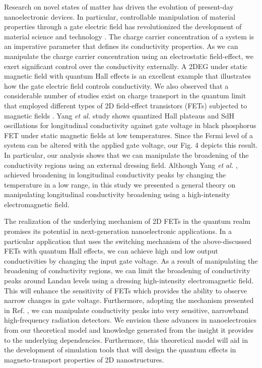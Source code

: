\documentclass{article}
\begin{document}
\begin{itemize}
{  Research on novel states of matter has driven the evolution of present-day nanoelectronic devices. In particular, controllable manipulation of material properties through a gate electric field has revolutionized the development of material science and technology \cite{ahn03,deng18}.
  The charge carrier concentration of a system is an imperative parameter that defines its conductivity properties.
  As we can manipulate the charge carrier concentration using an electrostatic field-effect, we exert significant control over the conductivity externally.
  A 2DEG under static magnetic field with quantum Hall effects is an excellent example that illustrates how the gate electric field controls conductivity.
  We also observed that a considerable number of studies exist on charge transport in the quantum limit that employed different types of 2D field-effect transistors (FETs) subjected to magnetic fields \cite{wakabayashi78,yang18,long20,li14}. Yang \textit{et al.} \cite{yang18} study shows quantized Hall plateaus and SdH oscillations for longitudinal conductivity against gate voltage in black phosphorus FET under static magnetic fields at low temperatures. Since the Fermi level of a system can be altered with the applied gate voltage, our Fig. 4 depicts this result.
  In particular, our analysis shows that we can manipulate the broadening of the conductivity regions using an external dressing field. Although Yang \textit{et al.} \cite{yang18}, achieved broadening in longitudinal conductivity peaks by changing the temperature in a low range, in this study we presented a general theory on manipulating longitudinal conductivity broadening using a high-intensity electromagnetic field.

  The realization of the underlying mechanism of 2D FETs in the quantum realm promises its potential in next-generation nanoelectronic applications. In a particular application that uses the switching mechanism of the above-discussed FETs with quantum Hall effects, we can achieve high and low output conductivities by changing the input gate voltage. As a result of manipulating the broadening of conductivity regions, we can limit the broadening of conductivity peaks around Landau levels using a dressing high-intensity electromagnetic field. This will enhance the sensitivity of FETs which provides the ability to observe narrow changes in gate voltage.
  Furthermore, adopting the mechanism presented in Ref. \cite{hirakawa01}, we can manipulate conductivity peaks into very sensitive, narrowband high-frequency radiation detectors.
  We envision these advances in nanoelectronics from our theoretical model and knowledge generated from the insight it provides to the underlying dependencies.
  Furthermore, this theoretical model will aid in the development of simulation tools that will design the quantum effects in
  magneto-transport properties of 2D nanostructures.
  }
\end{itemize}
\end{document}
